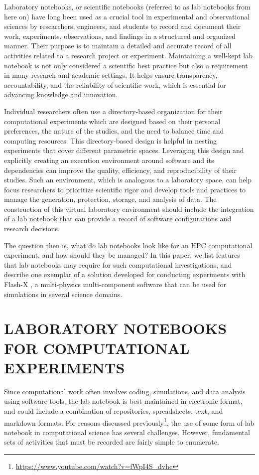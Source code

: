 \documentclass{IEEEcsmag}
\begin{document}
Laboratory notebooks, or scientific notebooks (referred to as lab notebooks from here on) have long been used as a crucial tool in experimental and observational sciences by researchers, engineers, and students to record and document their work, experiments, observations, and findings in a structured and organized manner. Their purpose is to maintain a
detailed and accurate record of all activities related to a research project or experiment. Maintaining a well-kept lab notebook is not only considered a scientific best practice but also a requirement in
many research and academic settings. It helps ensure transparency, accountability, and the reliability of scientific work, which is
essential for advancing knowledge and innovation.

Individual researchers often use a directory-based organization for their computational experiments which are designed based on their personal preferences, the nature of the studies, and the need to balance time and computing resources. This directory-based design is helpful in nesting experiments that cover different parametric spaces. Leveraging this design and explicitly creating an execution environment around software and its dependencies can improve the quality, efficiency, and reproducibility of their studies. Such an environment, which is analogous to a laboratory space, can help focus researchers to prioritize scientific rigor and develop tools and practices to manage the generation, protection, storage, and analysis of data. The construction of this virtual laboratory environment should include the integration of a lab notebook that can provide a record of software configurations and research decisions.
 
 
 The question then is, what do lab notebooks look like for an HPC computational experiment, and how should they be managed? In this paper, we list features that lab notebooks may require for such computational investigations, and describe one exemplar of a  solution developed for conducting experiments with Flash-X \cite{DUBEY2022101168}, a multi-physics multi-component software that can be used for simulations in several science domains.

\section{LABORATORY NOTEBOOKS FOR COMPUTATIONAL EXPERIMENTS}
Since computational work often involves coding, simulations, and data
analysis using software tools, the lab notebook is best maintained in
electronic format, and could include a combination of repositories,
spreadsheets, text, and markdown formats. 
{\color{red} For reasons discussed previously\footnote{\url{https://www.youtube.com/watch?v=fWpI4S_dvhc}}}, the use of some form of
lab notebook in computational science has several challenges.
{\color{red}However, fundamental sets of activities that must be recorded are fairly
simple to enumerate}. 
\end{document}
